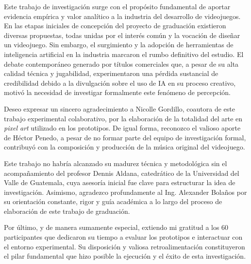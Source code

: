 Este trabajo de investigación surge con el propósito fundamental de aportar evidencia empírica y valor analítico a la industria del desarrollo de videojuegos. En las etapas iniciales de concepción del proyecto de graduación existieron diversas propuestas, todas unidas por el interés común y la vocación de diseñar un videojuego. Sin embargo, el surgimiento y la adopción de herramientas de inteligencia artificial en la industria marcaron el rumbo definitivo del estudio. El debate contemporáneo generado por títulos comerciales que, a pesar de su alta calidad técnica y jugabilidad, experimentaron una pérdida sustancial de credibilidad debido a la divulgación sobre el uso de IA en su proceso creativo, motivó la necesidad de investigar formalmente este fenómeno de percepción.

Deseo expresar un sincero agradecimiento a Nicolle Gordillo, coautora de este trabajo experimental colaborativo, por la elaboración de la totalidad del arte en \textit{pixel art} utilizado en los prototipos. De igual forma, reconozco el valioso aporte de Héctor Penedo, a pesar de no formar parte del equipo de investigación formal, contribuyó con la composición y producción de la música original del videojuego.

Este trabajo no habría alcanzado su madurez técnica y metodológica sin el acompañamiento del profesor Dennis Aldana, catedrático de la Universidad del Valle de Guatemala, cuya asesoría inicial fue clave para estructurar la idea de investigación. Asimismo, agradezco profundamente al Ing. Alexander Bolaños por su orientación constante, rigor y guía académica a lo largo del proceso de elaboración de este trabajo de graduación.

Por último, y de manera sumamente especial, extiendo mi gratitud a los 60 participantes que dedicaron su tiempo a evaluar los prototipos e interactuar con el entorno experimental. Su disposición y valiosa retroalimentación constituyeron el pilar fundamental que hizo posible la ejecución y el éxito de esta investigación. 